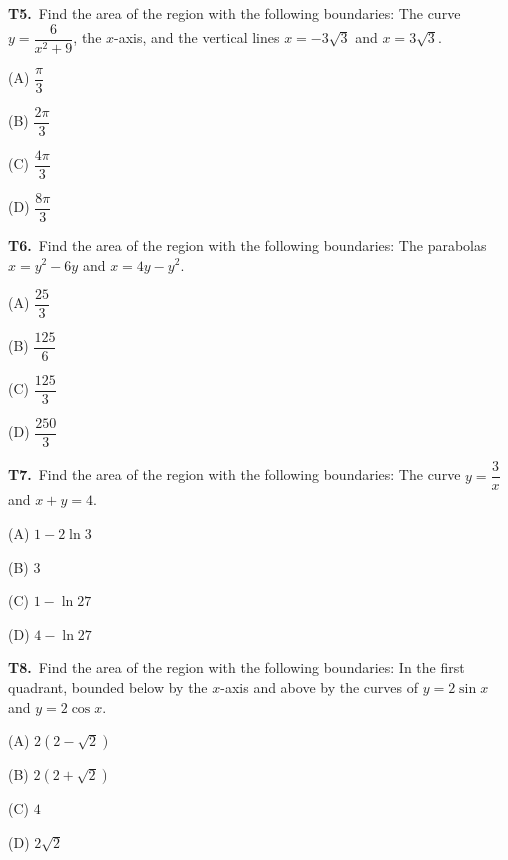\documentclass[11pt]{article}
\begin{document}
\bigskip\noindent\textbf{T5.}\ Find the area of the region with the following boundaries: The curve $y=\dfrac{6}{x^2+9}$, the $x$-axis, and the vertical lines $x=-3\sqrt{3}$ and $x=3\sqrt{3}$.
\begin{list}{}{\setlength{\leftmargin}{3em}\setlength{\labelwidth}{2.5em}\setlength{\itemsep}{0pt}\setlength{\topsep}{2pt}}
\item[(A)] $\dfrac{\pi}{3}$
\item[(B)] $\dfrac{2\pi}{3}$
\item[(C)] $\dfrac{4\pi}{3}$
\item[(D)] $\dfrac{8\pi}{3}$
\end{list}

\bigskip\noindent\textbf{T6.}\ Find the area of the region with the following boundaries: The parabolas $x=y^2-6y$ and $x=4y-y^2$.
\begin{list}{}{\setlength{\leftmargin}{3em}\setlength{\labelwidth}{2.5em}\setlength{\itemsep}{0pt}\setlength{\topsep}{2pt}}
\item[(A)] $\dfrac{25}{3}$
\item[(B)] $\dfrac{125}{6}$
\item[(C)] $\dfrac{125}{3}$
\item[(D)] $\dfrac{250}{3}$
\end{list}

\bigskip\noindent\textbf{T7.}\ Find the area of the region with the following boundaries: The curve $y=\dfrac{3}{x}$ and $x+y=4$.
\begin{list}{}{\setlength{\leftmargin}{3em}\setlength{\labelwidth}{2.5em}\setlength{\itemsep}{0pt}\setlength{\topsep}{2pt}}
\item[(A)] $1-2\ln 3$
\item[(B)] $3$
\item[(C)] $1-\ln 27$
\item[(D)] $4-\ln 27$
\end{list}

\bigskip\noindent\textbf{T8.}\ Find the area of the region with the following boundaries: In the first quadrant, bounded below by the $x$-axis and above by the curves of $y=2\sin x$ and $y=2\cos x$.
\begin{list}{}{\setlength{\leftmargin}{3em}\setlength{\labelwidth}{2.5em}\setlength{\itemsep}{0pt}\setlength{\topsep}{2pt}}
\item[(A)] $2(2-\sqrt{2})$
\item[(B)] $2(2+\sqrt{2})$
\item[(C)] $4$
\item[(D)] $2\sqrt{2}$
\end{list}
\end{document}
